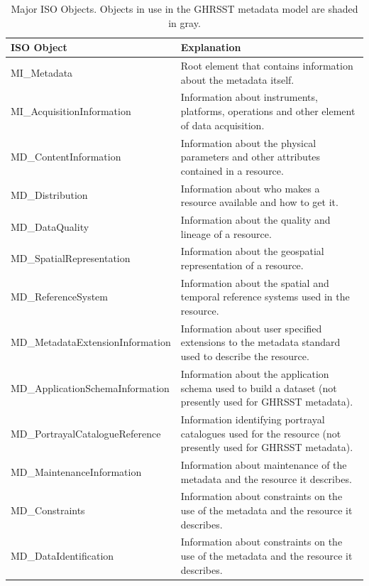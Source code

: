 \begin{longtable}{|p{}|p{}|}
    \caption{Major ISO Objects. Objects in use in the GHRSST metadata model are shaded in
gray.}
    \label{tab:table-major_iso_objects} \\
    \hline \endfirsthead
    \endhead
    \endfoot
    \hline \endlastfoot
    \textbf{ISO Object} & \textbf{Explanation} \\ \hline
    \rowcolor{lightgray} MI\_Metadata & Root element that contains information about the metadata itself. \\ \hline 
    \rowcolor{lightgray} MI\_AcquisitionInformation & Information about instruments, platforms, operations and other element of data acquisition. \\ \hline 
    \rowcolor{lightgray} MD\_ContentInformation & Information about the physical parameters and other attributes contained in a resource. \\ \hline
    \rowcolor{lightgray} MD\_Distribution & Information about who makes a resource available and how to get it. \\ \hline 
    \rowcolor{lightgray} MD\_DataQuality & Information about the quality and lineage of a resource. \\ \hline 
    \rowcolor{lightgray} MD\_SpatialRepresentation & Information about the geospatial representation of a resource. \\ \hline
    \rowcolor{lightgray} MD\_ReferenceSystem & Information about the spatial and temporal reference systems used in the resource. \\ \hline
    MD\_MetadataExtensionInformation  & Information about user specified extensions to the metadata standard used to describe the resource. \\ \hline
    MD\_ApplicationSchemaInformation & Information about the application schema used to build a dataset (not presently used for GHRSST metadata). \\ \hline 
    MD\_PortrayalCatalogueReference & Information identifying portrayal catalogues used for the resource (not presently used for GHRSST metadata). \\ \hline
    MD\_MaintenanceInformation & Information about maintenance of the metadata and the resource it describes. \\ \hline
    \rowcolor{lightgray}MD\_Constraints & Information about constraints on the use of the metadata and the resource it describes. \\ \hline
    \rowcolor{lightgray}MD\_DataIdentification & Information about constraints on the use of the metadata and the resource it describes. \\ \hline

\end{longtable}
